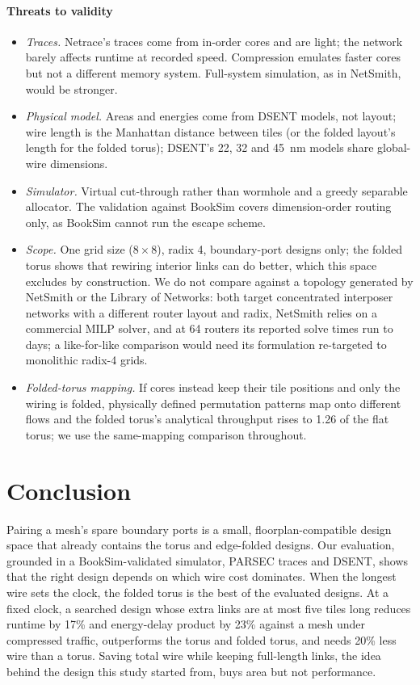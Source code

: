 \documentclass[preprint,12pt,a4paper]{elsarticle}
\begin{document}
\paragraph{Threats to validity}
\begin{itemize}
\item \emph{Traces.} Netrace's traces come from in-order cores and are
  light; the network barely affects runtime at recorded speed. Compression
  emulates faster cores but not a different memory system. Full-system
  simulation, as in NetSmith, would be stronger.
\item \emph{Physical model.} Areas and energies come from DSENT models, not
  layout; wire length is the Manhattan distance between tiles (or the
  folded layout's length for the folded torus); DSENT's 22, 32 and 45~nm
  models share global-wire dimensions.
\item \emph{Simulator.} Virtual cut-through rather than wormhole and a
  greedy separable allocator. The validation against BookSim covers
  dimension-order routing only, as BookSim cannot run the escape scheme.
\item \emph{Scope.} One grid size ($8\times 8$), radix 4, boundary-port
  designs only; the folded torus shows that rewiring interior links can do
  better, which this space excludes by construction. We do not compare
  against a topology generated by NetSmith or the Library of Networks: both
  target concentrated interposer networks with a different router layout
  and radix, NetSmith relies on a commercial MILP solver, and at 64 routers
  its reported solve times run to days; a like-for-like comparison would
  need its formulation re-targeted to monolithic radix-4 grids.
\item \emph{Folded-torus mapping.} If cores instead keep their tile
  positions and only the wiring is folded, physically defined permutation
  patterns map onto different flows and the folded torus's analytical
  throughput rises to 1.26 of the flat torus; we use the same-mapping
  comparison throughout.
\end{itemize}

\section{Conclusion}
\label{sec:conclusion}

Pairing a mesh's spare boundary ports is a small, floorplan-compatible
design space that already contains the torus and edge-folded designs. Our
evaluation, grounded in a BookSim-validated simulator, PARSEC traces and
DSENT, shows that the right design depends on which wire cost dominates.
When the longest wire sets the clock, the folded torus is the best of the
evaluated designs. At a fixed
clock, a searched design whose extra links are at most five tiles long
reduces runtime by 17\% and energy-delay product by 23\% against a mesh
under compressed traffic, outperforms the torus and folded torus, and needs
20\% less wire than a torus. Saving
total wire while keeping full-length links, the idea behind the design
this study started from, buys area but not performance.
\end{document}
